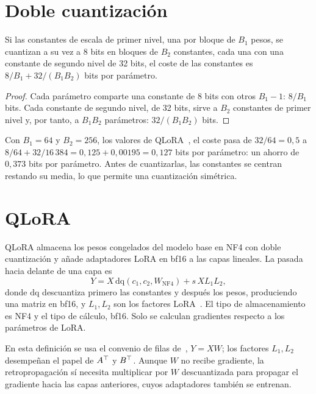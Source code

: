 \section{Doble cuantización}

\begin{proposicion}\label{prop:doble}
Si las constantes de escala de primer nivel, una por bloque de $B_1$ pesos, se cuantizan a su vez a 8 bits en bloques de $B_2$ constantes, cada una con una constante de segundo nivel de 32 bits, el coste de las constantes es $8/B_1+32/(B_1B_2)$ bits por parámetro.
\end{proposicion}

\begin{proof}
Cada parámetro comparte una constante de 8 bits con otros $B_1-1$: $8/B_1$ bits. Cada constante de segundo nivel, de 32 bits, sirve a $B_2$ constantes de primer nivel y, por tanto, a $B_1B_2$ parámetros: $32/(B_1B_2)$ bits.
\end{proof}

Con $B_1=64$ y $B_2=256$, los valores de QLoRA~\cite[§3]{dettmers}, el coste pasa de $32/64=0{,}5$ a $8/64+32/16\,384=0{,}125+0{,}00195=0{,}127$ bits por parámetro: un ahorro de $0{,}373$ bits por parámetro. Antes de cuantizarlas, las constantes se centran restando su media, lo que permite una cuantización simétrica.

\section{QLoRA}

\begin{definicion}[QLoRA]\label{def:qlora}
QLoRA almacena los pesos congelados del modelo base en NF4 con doble cuantización y añade adaptadores LoRA en bf16 a las capas lineales. La pasada hacia delante de una capa es
\[
Y=X\,\mathrm{dq}(c_1,c_2,W_{\mathrm{NF4}})+s\,X L_1L_2,
\]
donde $\mathrm{dq}$ descuantiza primero las constantes y después los pesos, produciendo una matriz en bf16, y $L_1,L_2$ son los factores LoRA~\cite[§3, ecs.~5 y~6]{dettmers}. El tipo de almacenamiento es NF4 y el tipo de cálculo, bf16. Solo se calculan gradientes respecto a los parámetros de LoRA.
\end{definicion}

En esta definición se usa el convenio de filas de~\cite{dettmers}, $Y=XW$; los factores $L_1,L_2$ desempeñan el papel de $A^{\top}$ y $B^{\top}$. Aunque $W$ no recibe gradiente, la retropropagación sí necesita multiplicar por $W$ descuantizada para propagar el gradiente hacia las capas anteriores, cuyos adaptadores también se entrenan.

